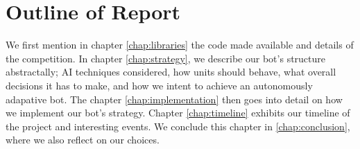 \section{Outline of Report}
We first mention in chapter \ref{chap:libraries} the code made available and details of the competition. In chapter \ref{chap:strategy}, we describe our bot's structure abstractally; AI techniques considered, how units should behave, what overall decisions it has to make, and how we intent to achieve an autonomously adapative bot. The chapter \ref{chap:implementation} then goes into detail on how we implement our bot's strategy. Chapter \ref{chap:timeline} exhibits our timeline of the project and interesting events. We conclude this chapter in \ref{chap:conclusion}, where we also reflect on our choices.







%
